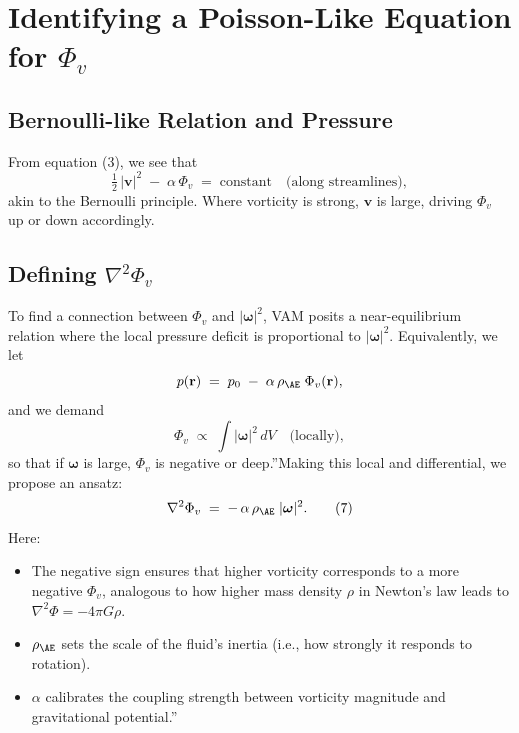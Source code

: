 \documentclass[a4paper,12pt]{article}
\begin{document}
\section{Identifying a Poisson-Like Equation for \(\Phi_v\)}

\subsection{Bernoulli-like Relation and Pressure}
From equation (3), we see that
\[
    \tfrac12\,|\mathbf{v}|^2
    \;-\;
    \alpha\,\Phi_v
    \;=\;
    \mathrm{constant}
    \quad
    \text{(along streamlines)},
\]
akin to the Bernoulli principle. Where vorticity is strong, \(\mathbf{v}\) is large, driving \(\Phi_v\) up or down accordingly.

\subsection{Defining \(\nabla^2 \Phi_v\)}
To find a connection between \(\Phi_v\) and \(|\boldsymbol{\omega}|^2\), VAM posits a near-equilibrium relation where the local pressure deficit is proportional to \(|\boldsymbol{\omega}|^2\). Equivalently, we let
\[
    p(\mathbf{r})
    \;=\;
    p_0
    \;-\;
    \alpha\,\rho_{\mathrm{\AE}}
    \;\Phi_v(\mathbf{r}),
\]
and we demand
\[
    \Phi_v
    \;\propto\;
    \int |\boldsymbol{\omega}|^2 \,dV
    \quad
    \text{(locally)},
\]
so that if \(\boldsymbol{\omega}\) is large, \(\Phi_v\) is negative or \grqq deep.\textquotedblright  Making this local and differential, we propose an ansatz:
\[
    \nabla^2 \Phi_v
    \;=\;
    -\,\alpha\,\rho_{\mathrm{\AE}}\;\lvert \boldsymbol{\omega}\rvert^2.
    \tag{7}
\]
Here:
\begin{itemize}
    \item The negative sign ensures that higher vorticity corresponds to a more negative \(\Phi_v\), analogous to how higher mass density \(\rho\) in Newton's law leads to \(\nabla^2 \Phi = -4\pi G\rho\).
    \item \(\rho_{\mathrm{\AE}}\) sets the scale of the fluid's inertia (i.e., how strongly it responds to rotation).
    \item \(\alpha\) calibrates the coupling strength between vorticity magnitude and \grqq gravitational potential.\textquotedblright
\end{itemize}
\end{document}
